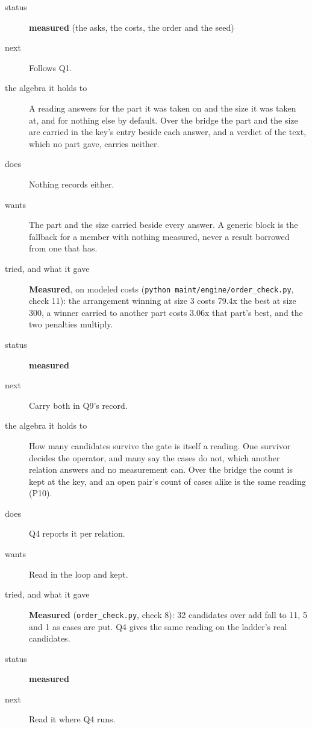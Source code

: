 \begin{description}
\item[{status}] \textbf{measured} (the asks, the costs, the order and the seed)
\item[{next}] Follows Q1.
\end{description}

\begin{description}
\item[{the algebra it holds to}] A reading answers for the part it was taken on and the size it was taken at, and for nothing else by default. Over the bridge the part and the size are carried in the key's entry beside each answer, and a verdict of the text, which no part gave, carries neither.
\item[{does}] Nothing records either.
\item[{wants}] The part and the size carried beside every answer. A generic block is the fallback for a member with nothing measured, never a result borrowed from one that has.
\item[{tried, and what it gave}] \textbf{Measured}, on modeled costs (\texttt{python maint/\allowbreak{}engine/\allowbreak{}order\_\allowbreak{}check.\allowbreak{}py}, check 11): the arrangement winning at size 3 costs 79.4x the best at size 300, a winner carried to another part costs 3.06x that part's best, and the two penalties multiply.
\item[{status}] \textbf{measured}
\item[{next}] Carry both in Q9's record.
\end{description}

\begin{description}
\item[{the algebra it holds to}] How many candidates survive the gate is itself a reading. One survivor decides the operator, and many say the cases do not, which another relation answers and no measurement can. Over the bridge the count is kept at the key, and an open pair's count of cases alike is the same reading (P10).
\item[{does}] Q4 reports it per relation.
\item[{wants}] Read in the loop and kept.
\item[{tried, and what it gave}] \textbf{Measured} (\texttt{order\_\allowbreak{}check.\allowbreak{}py}, check 8): 32 candidates over add fall to 11, 5 and 1 as cases are put. Q4 gives the same reading on the ladder's real candidates.
\item[{status}] \textbf{measured}
\item[{next}] Read it where Q4 runs.
\end{description}

